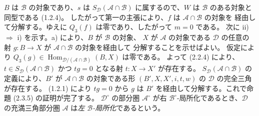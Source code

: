\clearpage
{}%
\begingroup
\small
\setlength{\parskip}{0pt}%
\setlength{\emergencystretch}{1.5em}%

\noindent $B$ は $\mathcal B$ の対象であり、$s$ は
$S_{\mathcal D}(\mathcal A\cap\mathcal B)$ に属するので、$W$ は
$\mathcal B$ のある対象と同型である (1.2.4)。
したがって第一の主張により、$f$ は $\mathcal A\cap\mathcal B$ の対象を
経由して分解する。ゆえに $Q_3(f)$ は零であり、したがって $m=0$ である。
次に ii) $\Rightarrow$ i) を示す。a) により、$B$ が $\mathcal B$ の対象、
$X$ が $\mathcal A$ の対象である $\mathcal D$ の任意の射
$g\colon B\longrightarrow X$ が $\mathcal A\cap\mathcal B$ の対象を経由して
分解することを示せばよい。
仮定により
$Q_3(g)\in\operatorname{Hom}_{\mathcal D/(\mathcal A\cap\mathcal B)}(B,X)$
は零である。
よって (2.2.4) により、$t\in S_{\mathcal D}(\mathcal A\cap\mathcal B)$
かつ $tg=0$ となる射 $t\colon X\longrightarrow X'$ が存在する。
$S_{\mathcal D}(\mathcal A\cap\mathcal B)$ の定義により、$B'$ が
$\mathcal A\cap\mathcal B$ の対象である形 $(B',X,X',i,t,w)$ の
$\mathcal D$ の完全三角が存在する。
(1.2.1) により $tg=0$ から $g$ は $B'$ を経由して分解する。これで命題
(2.3.5) の証明が完了する。
\medskip
$\mathcal D^\circ$ の部分圏 $\mathcal A^\circ$ が右
$\mathcal B^\circ$-局所化であるとき、$\mathcal D$ の充満三角部分圏
$\mathcal A$ は\emph{左 $\mathcal B$-局所化}であるという。
\endgroup
